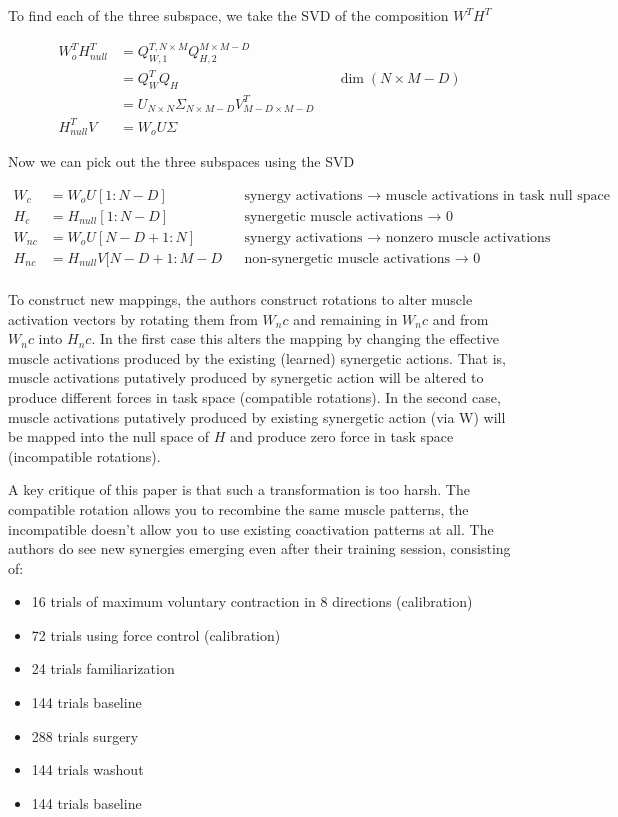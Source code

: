 \documentclass[
  a4paper,
]{article}
\providecommand{\tightlist}{%
  \setlength{\itemsep}{0pt}\setlength{\parskip}{0pt}}
\begin{document}
To find each of the three subspace, we take the SVD of the composition
\(W^TH^T\)

\begin{align*}
    W_o^TH^T_{null} &= Q_{W,1}^{T, N\times M} Q_{H,2}^{M\times M-D} \\
    &= Q^T_WQ_H && \dim(N \times M-D) \\
    &= U_{N\times N}\Sigma_{N \times M-D} V^T_{M-D\times M-D} \\
    H^T_{null}V &= W_oU\Sigma
\end{align*}

Now we can pick out the three subspaces using the SVD

\begin{align*}
    W_c &= W_oU[1:N-D] && \text{synergy activations $\rightarrow$ muscle activations in task null space}\\
    H_c &= H_{null}[1:N-D] && \text{synergetic muscle activations $\rightarrow$ 0} \\
    W_{nc} &= W_oU[N-D+1:N] && \text{synergy activations $\rightarrow$ nonzero muscle activations}\\
    H_{nc} &= H_{null}V[N-D+1:M-D && \text{non-synergetic muscle activations $\rightarrow$ 0} \\
\end{align*}

To construct new mappings, the authors construct rotations to alter
muscle activation vectors by rotating them from \(W_nc\) and remaining
in \(W_nc\) and from \(W_nc\) into \(H_nc\). In the first case this
alters the mapping by changing the effective muscle activations produced
by the existing (learned) synergetic actions. That is, muscle
activations putatively produced by synergetic action will be altered to
produce different forces in task space (compatible rotations). In the
second case, muscle activations putatively produced by existing
synergetic action (via W) will be mapped into the null space of \(H\)
and produce zero force in task space (incompatible rotations).

A key critique of this paper is that such a transformation is too harsh.
The compatible rotation allows you to recombine the same muscle
patterns, the incompatible doesn't allow you to use existing
coactivation patterns at all. The authors do see new synergies emerging
even after their training session, consisting of:

\begin{itemize}
\tightlist
\item
  16 trials of maximum voluntary contraction in 8 directions
  (calibration)
\item
  72 trials using force control (calibration)
\item
  24 trials familiarization
\item
  144 trials baseline
\item
  288 trials surgery
\item
  144 trials washout
\item
  144 trials baseline
\end{itemize}
\end{document}
